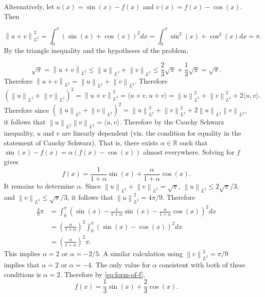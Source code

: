 \documentclass{exam}
\theoremstyle{problemstyle}
\newcommand{\norm}[1]{\left\lVert#1\right\rVert} %
\newcommand{\1}[1]{\textbf{1}_{\left[#1\right]}} %
\def\R{\mathbb{R}} %
\begin{document}
\begin{questions}
\begin{solution}
    Alternatively, let $u(x)= \sin(x)-f(x)$ and $v(x)=f(x)-\cos(x)$. Then

\begin{equation*}
  \norm{u+v}_{L^{2}}^{2} = \int_{0}^{\pi}\left( \sin(x)+\cos(x) \right)^{2}dx = \int_{0}^{\pi} \sin^{2}(x)+ \cos^{2}(x)dx =\pi.
\end{equation*}
By the triangle inequality and the hypotheses of the problem,

\begin{equation*}
  \sqrt{\pi}=\norm{u+v}_{L^{2}} \leq \norm{u}_{L^{2}} + \norm{v}_{L^{2}} \leq \frac{2}{3}\sqrt{\pi}+ \frac{1}{3}\sqrt{\pi}=\sqrt{\pi}.
\end{equation*}
Therefore
$\norm{u+v}_{L^{2}} = \norm{u}_{L^{2}} + \norm{v}_{L^{2}}$. Therefore
\begin{equation*}
  \left( \norm{u}_{L^{2}}+ \norm{v}_{L^{2}} \right)^{2} = \norm{u+v}_{L^{2}}^{2} = \langle u+v, u+v\rangle = \norm{u}^{2}_{L^{2}}+\norm{v}^{2}_{L^{2}} + 2\langle u,v\rangle.
\end{equation*}
Therefore since $  \left( \norm{u}_{L^{2}}+ \norm{v}_{L^{2}} \right)^{2}= \norm{u}_{L^{2}}^{2}+\norm{v}_{L^{2}}^{2}+2 \norm{u}_{L^{2}}\norm{v}_{L^{2}}$, it follows that $\norm{u}_{L^{2}}\norm{v}_{L^{2}}= \langle u, v \rangle$. Therefore by the Cauchy Schwarz inequality, $u$ and $v$ are linearly dependent (viz. the condition for equality in the statement of Cauchy Schwarz). That is, there exists $\alpha\in \R$ such that $\sin(x)-f(x)= \alpha \left( f(x)-\cos(x) \right)$ almost everywhere. Solving for $f$ gives
\begin{equation}\label{eq:form-of-f}
  f(x) = \frac{1}{1+\alpha}\sin(x)+ \frac{\alpha}{1+\alpha}\cos(x).
\end{equation}
It remains to determine $\alpha$. Since $\norm{u}_{L^{2}}+ \norm{v}_{L^{2}}=\sqrt{\pi}$, $\norm{u}_{L^{2}}\leq 2 \sqrt{\pi}/3$, and $\norm{v}_{L^{2}}\leq \sqrt{\pi}/3$, it follows that $\norm{u}^2_{L^{2}} = 4 \pi/9$. Therefore
\begin{align*}
  \frac{4}{9}\pi &= \int_{0}^{\pi}\left( \sin(x)- \frac{1}{1+\alpha}\sin(x) -\frac{\alpha}{1+\alpha}\cos(x)\right)^{2}dx\\
                 &= \left( \frac{\alpha}{1+\alpha} \right)^{2}\int_{0}^{\pi}\left( \sin(x)-\cos(x) \right)^{2}dx\\
                 &=  \left( \frac{\alpha}{1+\alpha} \right)^{2}\pi.
\end{align*}
This implies $\alpha = 2$ or $\alpha= -2/5$. A similar calculation using $\norm{v}^{2}_{L^{2}}= \pi /9$ implies that $\alpha = 2$ or $\alpha = -4$. The only value for $\alpha$ consistent with both of these conditions is $\alpha =2$. Therefore by \eqref{eq:form-of-f},
\begin{equation*}
  f(x) = \frac{1}{3}\sin(x)+ \frac{2}{3}\cos(x).
\end{equation*}
\end{solution}


\end{questions}
\end{document}
